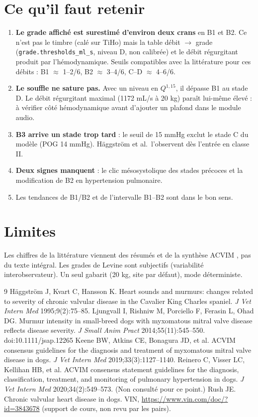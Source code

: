 \documentclass[10pt,a4paper]{article}
\begin{document}
\section{Ce qu'il faut retenir}
\begin{enumerate}
\item \textbf{Le grade affiché est surestimé d'environ deux crans} en B1 et B2. Ce n'est pas le timbre (calé sur TiHo) mais la table débit $\to$ grade (\texttt{grade.thresholds\_ml\_s}, niveau D, non calibrée) et le débit régurgitant produit par l'hémodynamique. Seuils compatibles avec la littérature pour ces débits : B1 $\approx$ 1--2/6, B2 $\approx$ 3--4/6, C--D $\approx$ 4--6/6.
\item \textbf{Le souffle ne sature pas.} Avec un niveau en $Q^{1{,}15}$, il dépasse B1 au stade D. Le débit régurgitant maximal (\num{1172} mL/s à 20 kg) paraît lui-même élevé : à vérifier côté hémodynamique avant d'ajouter un plafond dans le module audio.
\item \textbf{B3 arrive un stade trop tard} : le seuil de 15 mmHg exclut le stade C du modèle (POG 14 mmHg). Häggström et al.\ l'observent dès l'entrée en classe II.
\item \textbf{Deux signes manquent} : le clic mésosystolique des stades précoces et la modification de B2 en hypertension pulmonaire.
\item Les tendances de B1/B2 et de l'intervalle B1--B2 sont dans le bon sens.
\end{enumerate}

\section*{Limites}
Les chiffres de la littérature viennent des résumés \cite{haggstrom1995,ljungvall2014} et de la synthèse ACVIM \cite{keene2019}, pas du texte intégral. Les grades de Levine sont subjectifs (variabilité interobservateur). Un seul gabarit (20 kg, site par défaut), mode déterministe.

\begin{thebibliography}{9}
 Häggström J, Kvart C, Hansson K. Heart sounds and murmurs: changes related to severity of chronic valvular disease in the Cavalier King Charles spaniel. \emph{J Vet Intern Med} 1995;9(2):75--85.
 Ljungvall I, Rishniw M, Porciello F, Ferasin L, Ohad DG. Murmur intensity in small-breed dogs with myxomatous mitral valve disease reflects disease severity. \emph{J Small Anim Pract} 2014;55(11):545--550. doi:10.1111/jsap.12265
 Keene BW, Atkins CE, Bonagura JD, et al. ACVIM consensus guidelines for the diagnosis and treatment of myxomatous mitral valve disease in dogs. \emph{J Vet Intern Med} 2019;33(3):1127--1140.
 Reinero C, Visser LC, Kellihan HB, et al. ACVIM consensus statement guidelines for the diagnosis, classification, treatment, and monitoring of pulmonary hypertension in dogs. \emph{J Vet Intern Med} 2020;34(2):549--573. (Non consulté pour ce point.)
 Rush JE. Chronic valvular heart disease in dogs. VIN, \url{https://www.vin.com/doc/?id=3843678} (support de cours, non revu par les pairs).
\end{thebibliography}
\end{document}

